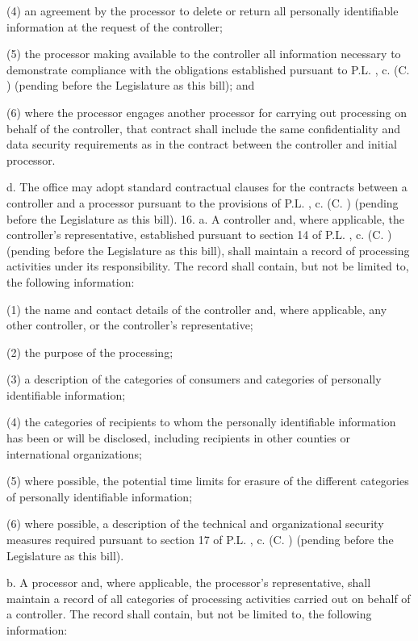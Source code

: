     (4)   an agreement by the processor to delete or return all personally identifiable information at the request of the controller;

     (5)   the processor making available to the controller all information necessary to demonstrate compliance with the obligations established pursuant to P.L.    , c.    (C.      ) (pending before the Legislature as this bill); and

     (6)   where the processor engages another processor for carrying out processing on behalf of the controller, that contract shall include the same confidentiality and data security requirements as in the contract between the controller and initial processor.

     d.    The office may adopt standard contractual clauses for the contracts between a controller and a processor pursuant to the provisions of P.L.    , c.    (C.      ) (pending before the Legislature as this bill).
     16.  a.  A controller and, where applicable, the controller's representative, established pursuant to section 14 of P.L.    , c.    (C.      ) (pending before the Legislature as this bill), shall maintain a record of processing activities under its responsibility. The record shall contain, but not be limited to, the following information:

     (1)   the name and contact details of the controller and, where applicable, any other controller, or the controller's representative;

     (2)   the purpose of the processing;

     (3)   a description of the categories of consumers and categories of personally identifiable information;

     (4)   the categories of recipients to whom the personally identifiable information has been or will be disclosed, including recipients in other counties or international organizations;

     (5)   where possible, the potential time limits for erasure of the different categories of personally identifiable information;

     (6)   where possible, a description of the technical and organizational security measures required pursuant to section 17 of P.L.    , c.    (C.      ) (pending before the Legislature as this bill).

     b.    A processor and, where applicable, the processor's representative, shall maintain a record of all categories of processing activities carried out on behalf of a controller. The record shall contain, but not be limited to, the following information:

